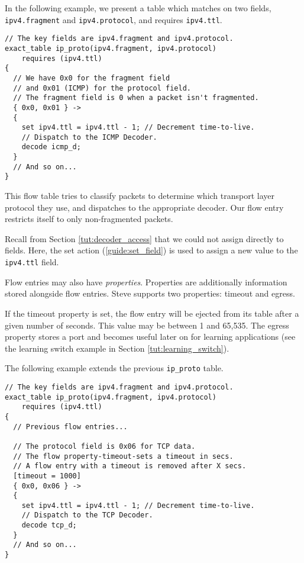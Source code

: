 In the following example, we present a table which matches on two fields, \texttt{ipv4.fragment} and \texttt{ipv4.protocol}, and requires \texttt{ipv4.ttl}.

\begin{codepage}
\begin{lstlisting}
// The key fields are ipv4.fragment and ipv4.protocol.
exact_table ip_proto(ipv4.fragment, ipv4.protocol)
	requires (ipv4.ttl)
{  
  // We have 0x0 for the fragment field
  // and 0x01 (ICMP) for the protocol field.
  // The fragment field is 0 when a packet isn't fragmented.
  { 0x0, 0x01 } ->
  {
  	set ipv4.ttl = ipv4.ttl - 1; // Decrement time-to-live.
  	// Dispatch to the ICMP Decoder.
  	decode icmp_d;
  }
  // And so on...
}
\end{lstlisting}
\end{codepage}

This flow table tries to classify packets to determine which transport layer protocol \cite{osi_model} they use, and dispatches to the appropriate decoder. Our flow entry restricts itself to only non-fragmented packets.

Recall from Section \ref{tut:decoder_access} that we could not assign directly to fields. Here, the set action (\ref{guide:set_field}) is used to assign a new value to the \texttt{ipv4.ttl} field.

Flow entries may also have \textit{properties}. Properties are additionally information stored alongside flow entries. Steve supports two properties: timeout and egress.

If the timeout property is set, the flow entry will be ejected from its table after a given number of seconds. This value may be between 1 and 65,535. The egress property stores a port and becomes useful later on for learning applications (see the learning switch example in Section \ref{tut:learning_switch}).

The following example extends the previous \texttt{ip\_proto} table.

\begin{codepage}
\begin{lstlisting}
// The key fields are ipv4.fragment and ipv4.protocol.
exact_table ip_proto(ipv4.fragment, ipv4.protocol)
	requires (ipv4.ttl)
{  
  // Previous flow entries...
  
  // The protocol field is 0x06 for TCP data.
  // The flow property-timeout-sets a timeout in secs.
  // A flow entry with a timeout is removed after X secs.
  [timeout = 1000]
  { 0x0, 0x06 } ->
  {
  	set ipv4.ttl = ipv4.ttl - 1; // Decrement time-to-live.
  	// Dispatch to the TCP Decoder.
  	decode tcp_d;
  } 
  // And so on...
}
\end{lstlisting}
\end{codepage}

